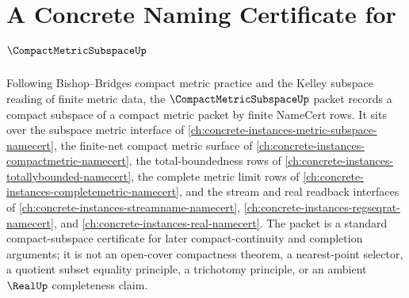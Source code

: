 \chapter{A Concrete Naming Certificate for $\CompactMetricSubspaceUp$}
\label{ch:concrete-instances-compact-metric-subspace-namecert}

Following Bishop--Bridges compact metric practice and the Kelley subspace reading of finite metric data, the $\CompactMetricSubspaceUp$ packet records a compact subspace of a compact metric packet by finite NameCert rows. It sits over the subspace metric interface of \autoref{ch:concrete-instances-metric-subspace-namecert}, the finite-net compact metric surface of \autoref{ch:concrete-instances-compactmetric-namecert}, the total-boundedness rows of \autoref{ch:concrete-instances-totallybounded-namecert}, the complete metric limit rows of \autoref{ch:concrete-instances-completemetric-namecert}, and the stream and real readback interfaces of \autoref{ch:concrete-instances-streamname-namecert}, \autoref{ch:concrete-instances-regseqrat-namecert}, and \autoref{ch:concrete-instances-real-namecert}. The packet is a standard compact-subspace certificate for later compact-continuity and completion arguments; it is not an open-cover compactness theorem, a nearest-point selector, a quotient subset equality principle, a trichotomy principle, or an ambient $\RealUp$ completeness claim.


